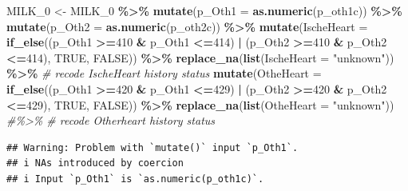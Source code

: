 \documentclass[
]{article}
\newenvironment{Shaded}{\begin{snugshade}}{\end{snugshade}}
\newcommand{\CommentTok}[1]{\textcolor[rgb]{0.56,0.35,0.01}{\textit{#1}}}
\newcommand{\DataTypeTok}[1]{\textcolor[rgb]{0.13,0.29,0.53}{#1}}
\newcommand{\DecValTok}[1]{\textcolor[rgb]{0.00,0.00,0.81}{#1}}
\newcommand{\KeywordTok}[1]{\textcolor[rgb]{0.13,0.29,0.53}{\textbf{#1}}}
\newcommand{\NormalTok}[1]{#1}
\newcommand{\OperatorTok}[1]{\textcolor[rgb]{0.81,0.36,0.00}{\textbf{#1}}}
\newcommand{\OtherTok}[1]{\textcolor[rgb]{0.56,0.35,0.01}{#1}}
\newcommand{\StringTok}[1]{\textcolor[rgb]{0.31,0.60,0.02}{#1}}
\begin{document}
\begin{Shaded}
\begin{Highlighting}[]
\NormalTok{MILK\_}\DecValTok{0}\NormalTok{ \textless{}{-}}\StringTok{ }\NormalTok{MILK\_}\DecValTok{0} \OperatorTok{\%\textgreater{}\%}\StringTok{ }
\StringTok{  }\KeywordTok{mutate}\NormalTok{(}\DataTypeTok{p\_Oth1 =} \KeywordTok{as.numeric}\NormalTok{(p\_oth1c)) }\OperatorTok{\%\textgreater{}\%}\StringTok{ }
\StringTok{  }\KeywordTok{mutate}\NormalTok{(}\DataTypeTok{p\_Oth2 =} \KeywordTok{as.numeric}\NormalTok{(p\_oth2c)) }\OperatorTok{\%\textgreater{}\%}\StringTok{ }
\StringTok{  }\KeywordTok{mutate}\NormalTok{(}\DataTypeTok{IscheHeart =} \KeywordTok{if\_else}\NormalTok{((p\_Oth1 }\OperatorTok{\textgreater{}=}\DecValTok{410} \OperatorTok{\&}\StringTok{ }\NormalTok{p\_Oth1 }\OperatorTok{\textless{}=}\DecValTok{414}\NormalTok{) }\OperatorTok{|}\StringTok{ }
\StringTok{                                }\NormalTok{(p\_Oth2 }\OperatorTok{\textgreater{}=}\DecValTok{410} \OperatorTok{\&}\StringTok{ }\NormalTok{p\_Oth2 }\OperatorTok{\textless{}=}\DecValTok{414}\NormalTok{), }\OtherTok{TRUE}\NormalTok{, }\OtherTok{FALSE}\NormalTok{)) }\OperatorTok{\%\textgreater{}\%}\StringTok{ }
\StringTok{  }\KeywordTok{replace\_na}\NormalTok{(}\KeywordTok{list}\NormalTok{(}\DataTypeTok{IscheHeart =} \StringTok{"unknown"}\NormalTok{)) }\OperatorTok{\%\textgreater{}\%}\StringTok{ }\CommentTok{\# recode IscheHeart history status}
\StringTok{  }\KeywordTok{mutate}\NormalTok{(}\DataTypeTok{OtheHeart =} \KeywordTok{if\_else}\NormalTok{((p\_Oth1 }\OperatorTok{\textgreater{}=}\DecValTok{420} \OperatorTok{\&}\StringTok{ }\NormalTok{p\_Oth1 }\OperatorTok{\textless{}=}\DecValTok{429}\NormalTok{) }\OperatorTok{|}\StringTok{ }
\StringTok{                                }\NormalTok{(p\_Oth2 }\OperatorTok{\textgreater{}=}\DecValTok{420} \OperatorTok{\&}\StringTok{ }\NormalTok{p\_Oth2 }\OperatorTok{\textless{}=}\DecValTok{429}\NormalTok{), }\OtherTok{TRUE}\NormalTok{, }\OtherTok{FALSE}\NormalTok{)) }\OperatorTok{\%\textgreater{}\%}\StringTok{ }
\StringTok{  }\KeywordTok{replace\_na}\NormalTok{(}\KeywordTok{list}\NormalTok{(}\DataTypeTok{OtheHeart =} \StringTok{"unknown"}\NormalTok{)) }\CommentTok{\#\%\textgreater{}\% \# recode Otherheart history status}
\end{Highlighting}
\end{Shaded}

\begin{verbatim}
## Warning: Problem with `mutate()` input `p_Oth1`.
## i NAs introduced by coercion
## i Input `p_Oth1` is `as.numeric(p_oth1c)`.
\end{verbatim}
\end{document}
